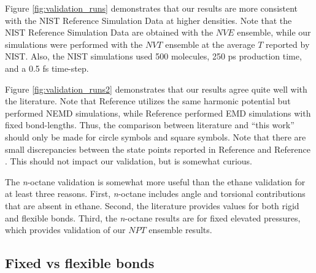 \documentclass[preprint,review,12pt]{elsarticle}
\begin{document}
    Figure \ref{fig:validation_runs} demonstrates that our results are more consistent with the NIST Reference Simulation Data at higher densities. Note that the NIST Reference Simulation Data are obtained with the $NVE$ ensemble, while our simulations were performed with the $NVT$ ensemble at the average $T$ reported by NIST. Also, the NIST simulations used 500 molecules, 250 ps production time, and a 0.5 fs time-step.  
    
    Figure \ref{fig:validation_runs2} demonstrates that our results agree quite well with the literature. Note that Reference  utilizes the same harmonic potential but performed NEMD simulations, while Reference  performed EMD simulations with fixed bond-lengths. Thus, the comparison between literature and ``this work'' should only be made for circle symbols and square symbols.  Note that there are small discrepancies between the state points reported in Reference  and Reference . This should not impact our validation, but is somewhat curious. 
    
    The \textit{n}-octane validation is somewhat more useful than the ethane validation for at least three reasons. First, \textit{n}-octane includes angle and torsional contributions that are absent in ethane. Second, the literature provides values for both rigid and flexible bonds. Third, the \textit{n}-octane results are for fixed elevated pressures, which provides validation of our $NPT$ ensemble results.
    
%	
	
	\subsection{Fixed vs flexible bonds} \label{fixed flexbile}
	
	
\end{document}
